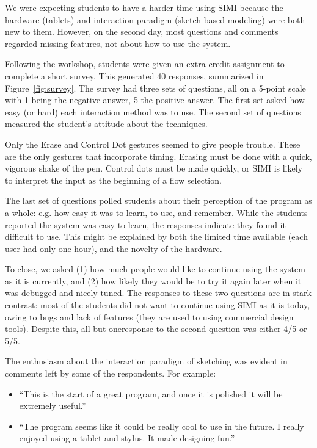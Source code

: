 \documentclass{article}
\begin{document}
We were expecting students to have a harder time using SIMI because
the hardware (tablets) and interaction paradigm (sketch-based
modeling) were both new to them. However, on the second day, most
questions and comments regarded missing features, not about how to use
the system. 

Following the workshop, students were given an extra credit assignment
to complete a short survey. This generated 40 responses, summarized in
Figure~\ref{fig:survey}. The survey had three sets of questions, all
on a 5-point scale with 1 being the negative answer, 5 the positive
answer. The first set asked how easy (or hard) each interaction method
was to use. The second set of questions measured the student's
attitude about the techniques.

Only the Erase and Control Dot gestures seemed to give people
trouble. These are the only gestures that incorporate timing. Erasing
must be done with a quick, vigorous shake of the pen. Control dots
must be made quickly, or SIMI is likely to interpret the input as the
beginning of a flow selection.

The last set of questions polled students about their perception of
the program as a whole: e.g. how easy it was to learn, to use, and
remember. While the students reported the system was easy to learn,
the responses indicate they found it difficult to use. This might be
explained by both the limited time available (each user had only one
hour), and the novelty of the hardware.

To close, we asked (1) how much people would like to continue using
the system as it is currently, and (2) how likely they would be to try
it again later when it was debugged and nicely tuned. The responses to
these two questions are in stark contrast: most of the students did
not want to continue using SIMI as it is today, owing to bugs and lack
of features (they are used to using commercial design tools). Despite
this, all but oneresponse to the second question was either 4/5 or
5/5.

The enthusiasm about the interaction paradigm of sketching was evident
in comments left by some of the respondents. For example:

\begin{itemize}
\item ``This is the start of a great program, and once it is polished it
  will be extremely useful.''
\item ``The program seems like it could be really cool to use in the
  future. I really enjoyed using a tablet and stylus. It made
  designing fun.''
\end{itemize}
\end{document}
